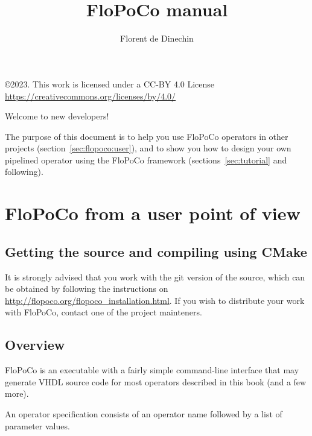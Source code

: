 \documentclass{article}
\title{
    \scalebox{0.3}{\mbox{}}\\
FloPoCo   manual
}
\author{Florent de Dinechin}
\begin{document}
 
\sloppy



\maketitle

\begin{center}
\begin{boxedminipage}{\textwidth}
  \begin{center}
\copyright 2023. This work is licensed under a CC-BY 4.0 License\\\url{https://creativecommons.org/licenses/by/4.0/}  
\end{center}
\end{boxedminipage}
\end{center}



Welcome to new developers! 

The purpose of this document is to help you use FloPoCo operators in other projects (section~\ref{sec:flopoco:user}), and to show you how to design your own pipelined operator using the FloPoCo framework (sections~\ref{sec:tutorial} and following). 

\tableofcontents



\section{FloPoCo from a user point of view\label{sec:flopoco:user}}


\subsection{Getting the source and compiling using CMake}

It is strongly advised that you work with the git version of the source, which can be obtained by following the instructions on
\url{http://flopoco.org/flopoco_installation.html}.
If you wish to distribute your work with FloPoCo, contact one of the project mainteners.

\subsection{Overview}
FloPoCo is an executable with a fairly simple command-line interface  that may generate VHDL source code for most operators described in this book (and a few more).

An operator specification consists of an operator name followed by a list of parameter values.
\end{document}
